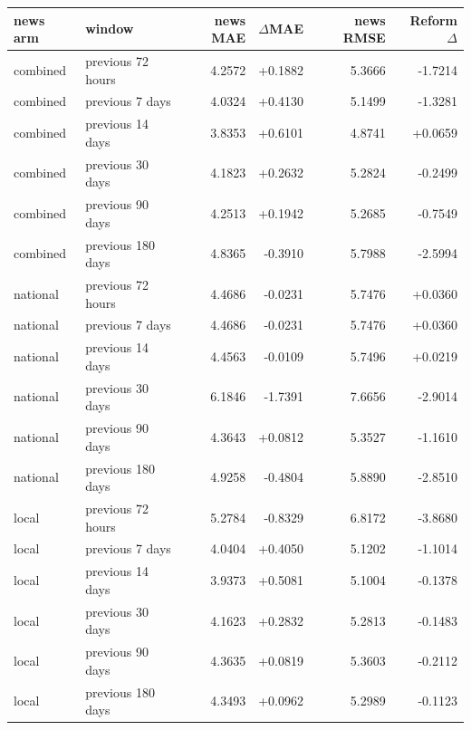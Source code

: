 \begin{tabular}{llrrrr}
\toprule
news arm & window & news MAE & $\Delta$MAE & news RMSE & Reform $\Delta$ \\
\midrule
combined & previous 72 hours & 4.2572 & +0.1882 & 5.3666 & -1.7214 \\
combined & previous 7 days & 4.0324 & +0.4130 & 5.1499 & -1.3281 \\
combined & previous 14 days & 3.8353 & +0.6101 & 4.8741 & +0.0659 \\
combined & previous 30 days & 4.1823 & +0.2632 & 5.2824 & -0.2499 \\
combined & previous 90 days & 4.2513 & +0.1942 & 5.2685 & -0.7549 \\
combined & previous 180 days & 4.8365 & -0.3910 & 5.7988 & -2.5994 \\
national & previous 72 hours & 4.4686 & -0.0231 & 5.7476 & +0.0360 \\
national & previous 7 days & 4.4686 & -0.0231 & 5.7476 & +0.0360 \\
national & previous 14 days & 4.4563 & -0.0109 & 5.7496 & +0.0219 \\
national & previous 30 days & 6.1846 & -1.7391 & 7.6656 & -2.9014 \\
national & previous 90 days & 4.3643 & +0.0812 & 5.3527 & -1.1610 \\
national & previous 180 days & 4.9258 & -0.4804 & 5.8890 & -2.8510 \\
local & previous 72 hours & 5.2784 & -0.8329 & 6.8172 & -3.8680 \\
local & previous 7 days & 4.0404 & +0.4050 & 5.1202 & -1.1014 \\
local & previous 14 days & 3.9373 & +0.5081 & 5.1004 & -0.1378 \\
local & previous 30 days & 4.1623 & +0.2832 & 5.2813 & -0.1483 \\
local & previous 90 days & 4.3635 & +0.0819 & 5.3603 & -0.2112 \\
local & previous 180 days & 4.3493 & +0.0962 & 5.2989 & -0.1123 \\
\bottomrule
\end{tabular}
